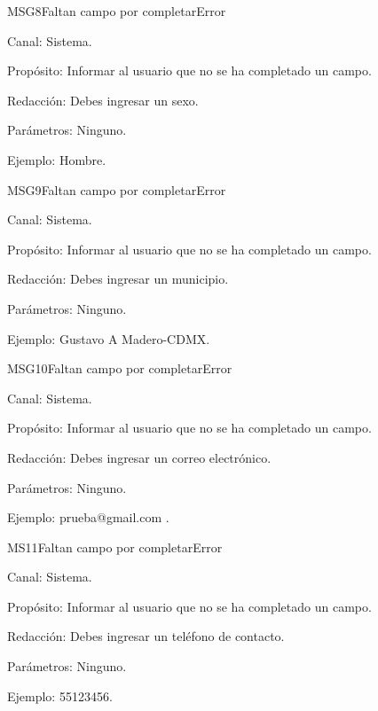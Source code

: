 
\begin{mensaje}{MSG8}{Faltan campo por completar}{Error}
	\item[Canal:] Sistema.
	\item[Propósito:] Informar al usuario que no se ha completado un campo.
	\item[Redacción:] Debes ingresar un sexo.
	\item[Parámetros:] Ninguno.
	\item[Ejemplo:] Hombre.
\end{mensaje}
\newline



\begin{mensaje}{MSG9}{Faltan campo por completar}{Error}
	\item[Canal:] Sistema.
	\item[Propósito:] Informar al usuario que no se ha completado un campo.
	\item[Redacción:] Debes ingresar un municipio.
	\item[Parámetros:] Ninguno.
	\item[Ejemplo:] Gustavo A Madero-CDMX.
\end{mensaje}
\newline



\begin{mensaje}{MSG10}{Faltan campo por completar}{Error}
	\item[Canal:] Sistema.
	\item[Propósito:] Informar al usuario que no se ha completado un campo.
	\item[Redacción:] Debes ingresar un correo electrónico.
	\item[Parámetros:] Ninguno.
	\item[Ejemplo:] prueba@gmail.com .
\end{mensaje}
\newline



\begin{mensaje}{MS11}{Faltan campo por completar}{Error}
	\item[Canal:] Sistema.
	\item[Propósito:] Informar al usuario que no se ha completado un campo.
	\item[Redacción:] Debes ingresar un teléfono de contacto.
	\item[Parámetros:] Ninguno.
	\item[Ejemplo:] 55123456.
\end{mensaje}
\newline


